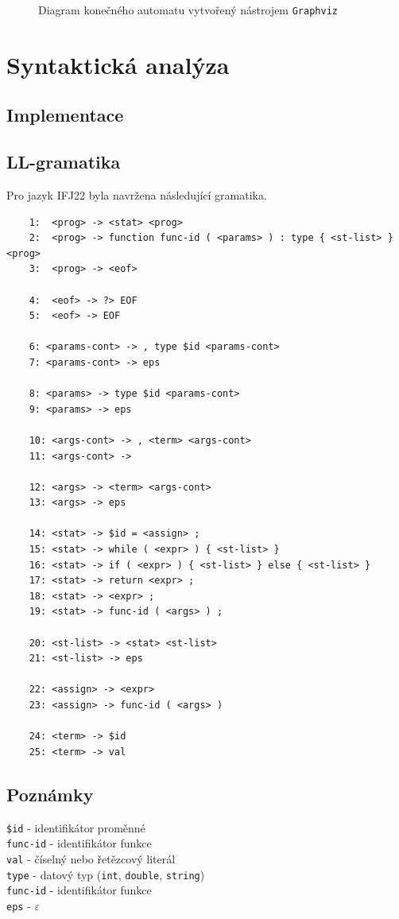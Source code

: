 \documentclass[11pt,a4paper]{article}
\begin{document}
\begin{figure}[H]
	\caption{Diagram konečného automatu vytvořený nástrojem \texttt{Graphviz}}
\end{figure}

\pagebreak{}
    
\section{Syntaktická analýza}
    
\subsection{Implementace}

\subsection{LL-gramatika}
Pro jazyk IFJ22 byla navržena následující gramatika.
\begin{Verbatim}
	1:  <prog> -> <stat> <prog>
	2:  <prog> -> function func-id ( <params> ) : type { <st-list> } <prog>
	3:  <prog> -> <eof>
	
	4:  <eof> -> ?> EOF
	5:  <eof> -> EOF
	
	6: <params-cont> -> , type $id <params-cont>
	7: <params-cont> -> eps
	
	8: <params> -> type $id <params-cont>
	9: <params> -> eps
	
	10: <args-cont> -> , <term> <args-cont>
	11: <args-cont> -> 
	
	12: <args> -> <term> <args-cont>
	13: <args> -> eps
	
	14: <stat> -> $id = <assign> ;
	15: <stat> -> while ( <expr> ) { <st-list> }
	16: <stat> -> if ( <expr> ) { <st-list> } else { <st-list> }
	17: <stat> -> return <expr> ;
	18: <stat> -> <expr> ;
	19: <stat> -> func-id ( <args> ) ;
	
	20: <st-list> -> <stat> <st-list>
	21: <st-list> -> eps
	
	22: <assign> -> <expr>
	23: <assign> -> func-id ( <args> )
	
	24: <term> -> $id
	25: <term> -> val
\end{Verbatim}
\subsection*{Poznámky}
\texttt{\$id} - identifikátor proměnné\\
\texttt{func-id} - identifikátor funkce\\
\texttt{val} - číselný nebo řetězcový literál \\
\texttt{type} - datový typ (\texttt{int}, \texttt{double}, \texttt{string}) \\
\texttt{func-id} - identifikátor funkce \\
\texttt{eps} - $\varepsilon$ \\
\end{document}
